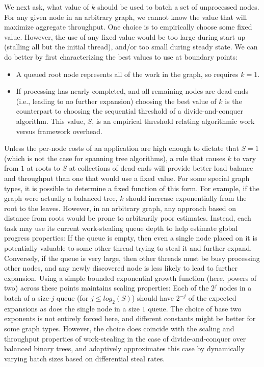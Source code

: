 We next ask, what value of $k$ should be used to batch a set of
unprocessed nodes. For any given node in an arbitrary graph, we cannot
know the value that will maximize aggregate throughput.
One choice is to empirically choose some fixed value. However,
the use of any fixed value would be too large during start up
(stalling all but the initial thread), and/or too small during
steady state. We can do better by first characterizing the
best values to use at boundary points:
\begin{itemize}
  \item A queued root node represents all of the work in the graph, so
    requires $k=1$.
  \item If processing has nearly completed, and all remaining nodes are
    dead-ends (i.e., leading to no further expansion) choosing the
    best value of $k$ is the counterpart to choosing the sequential
    threshold of a divide-and-conquer algorithm.  This value, $S$, is an
    empirical threshold relating algorithmic work versus framework
    overhead.  
\end{itemize}

Unless the per-node costs of an application are high enough to dictate
that $S=1$ (which is not the case for spanning tree algorithms), a rule
that causes $k$ to vary from $1$ at roots to $S$ at collections of dead-ends
will provide better load balance and throughput than one that would use a
fixed value. For some special graph types, it is possible to determine
a fixed function of this form. For example, if the graph were actually
a balanced tree, $k$ should increase exponentially from the root to the
leaves. However, in an arbitrary graph, any approach based on distance
from roots would be prone to arbitrarily poor estimates.  Instead, each
task may use its current work-stealing queue depth to help estimate
global progress properties: If the queue is empty, then even a single
node placed on it is potentially valuable to some other thread trying
to steal it and further expand.  Conversely, if the queue is very
large, then other threads must be busy processing other nodes, and any
newly discovered node is less likely to lead to further expansion.
Using a simple bounded exponential growth function (here, powers of
two) across these points maintains scaling properties: Each of the 
$2^j$ nodes in a batch of a size-$j$ queue (for $j \leq log_2(S)$) should have
$2^{-j}$ of the expected expansions as does the single node in a size $1$
queue. The choice of base two exponents is not entirely forced here,
and different constants might be better for some graph types.
However, the choice does coincide with the scaling and throughput
properties of work-stealing in the case of divide-and-conquer over
balanced binary trees, and adaptively approximates this case by
dynamically varying batch sizes based on differential steal rates.


